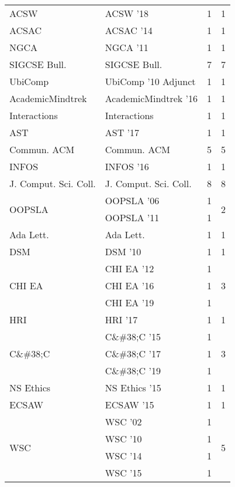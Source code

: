 \begin{table*}[t]
\begin{tabular}{llrr}
\multirow{1}{*}{ACSW } & ACSW '18 & 1 & \multirow{1}{*}{1}\\
\multirow{1}{*}{ACSAC } & ACSAC '14 & 1 & \multirow{1}{*}{1}\\
\multirow{1}{*}{NGCA } & NGCA '11 & 1 & \multirow{1}{*}{1}\\
\multirow{1}{*}{SIGCSE Bull.} & SIGCSE Bull. & 7 & \multirow{1}{*}{7}\\
\multirow{1}{*}{UbiComp } & UbiComp '10 Adjunct & 1 & \multirow{1}{*}{1}\\
\multirow{1}{*}{AcademicMindtrek } & AcademicMindtrek '16 & 1 & \multirow{1}{*}{1}\\
\multirow{1}{*}{Interactions} & Interactions & 1 & \multirow{1}{*}{1}\\
\multirow{1}{*}{AST } & AST '17 & 1 & \multirow{1}{*}{1}\\
\multirow{1}{*}{Commun. ACM} & Commun. ACM & 5 & \multirow{1}{*}{5}\\
\multirow{1}{*}{INFOS } & INFOS '16 & 1 & \multirow{1}{*}{1}\\
\multirow{1}{*}{J. Comput. Sci. Coll.} & J. Comput. Sci. Coll. & 8 & \multirow{1}{*}{8}\\
\multirow{2}{*}{OOPSLA } & OOPSLA '06 & 1 & \multirow{2}{*}{2}\\
& OOPSLA '11 & 1 &\\
\multirow{1}{*}{Ada Lett.} & Ada Lett. & 1 & \multirow{1}{*}{1}\\
\multirow{1}{*}{DSM } & DSM '10 & 1 & \multirow{1}{*}{1}\\
\multirow{3}{*}{CHI EA } & CHI EA '12 & 1 & \multirow{3}{*}{3}\\
& CHI EA '16 & 1 &\\
& CHI EA '19 & 1 &\\
\multirow{1}{*}{HRI } & HRI '17 & 1 & \multirow{1}{*}{1}\\
\multirow{3}{*}{C\&\#38;C } & C\&\#38;C '15 & 1 & \multirow{3}{*}{3}\\
& C\&\#38;C '17 & 1 &\\
& C\&\#38;C '19 & 1 &\\
\multirow{1}{*}{NS Ethics } & NS Ethics '15 & 1 & \multirow{1}{*}{1}\\
\multirow{1}{*}{ECSAW } & ECSAW '15 & 1 & \multirow{1}{*}{1}\\
\multirow{5}{*}{WSC } & WSC '02 & 1 & \multirow{5}{*}{5}\\
& WSC '10 & 1 &\\
& WSC '14 & 1 &\\
& WSC '15 & 1 &\\

\end{tabular}
\end{table*}
